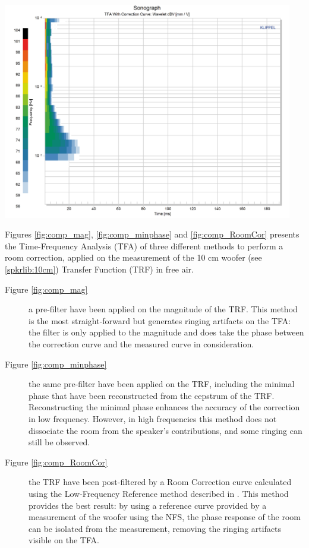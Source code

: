 \documentclass{report}
\begin{document}
\begin{minipage}{0.33\textwidth}
\begin{center}
	\includegraphics[width=0.95\textwidth]{RoomComp/Sonograph_RoomCor} 
    \captionsetup{hypcap=false} 
	\label{fig:comp_RoomCor}
\end{center}
\end{minipage}
\vspace{0.1cm}

Figures \ref{fig:comp_mag}, \ref{fig:comp_minphase} and \ref{fig:comp_RoomCor} presents the Time-Frequency Analysis (TFA) of three different methods to perform a room correction, applied on the measurement of the 10 cm woofer (see \ref{spkrlib:10cm}) Transfer Function (TRF) in free air.
\begin{description}
\item[Figure \ref{fig:comp_mag}] a pre-filter have been applied on the magnitude of the TRF. This method is the most straight-forward but generates ringing artifacts on the TFA: the filter is only applied to the magnitude and does take the phase between the correction curve and the measured curve in consideration. 
\item[Figure \ref{fig:comp_minphase}] the same pre-filter have been applied on the TRF, including the minimal phase that have been reconstructed from the cepstrum of the TRF. Reconstructing the minimal phase enhances the accuracy of the correction in low frequency. However, in high frequencies this method does not dissociate the room from the speaker's contributions, and some ringing can still be observed.
\item[Figure \ref{fig:comp_RoomCor}] the TRF have been post-filtered by a Room Correction curve calculated using the Low-Frequency Reference method described in \citep[][sect.~4]{aeswb}. This method provides the best result: by using a reference curve provided by a measurement of the woofer using the NFS, the phase response of the room can be isolated from the measurement, removing the ringing artifacts visible on the TFA. 
\end{description}
\end{document}
